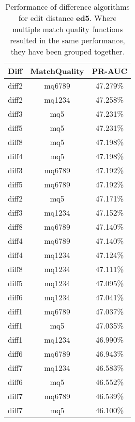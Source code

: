 \begin{table}[tbph]
\begin{center}
\begin{tabular}{|c|c||c|}
\hline
Diff & MatchQuality & PR-AUC  \\
\hline
\hline
diff2 & mq6789 & 47.279\% \\
diff2 & mq1234 & 47.258\% \\
diff3 & mq5 & 47.231\% \\
diff5 & mq5 & 47.231\% \\
diff8 & mq5 & 47.198\% \\
diff4 & mq5 & 47.198\% \\
diff3 & mq6789 & 47.192\% \\
diff5 & mq6789 & 47.192\% \\
diff2 & mq5 & 47.171\% \\
diff3 & mq1234 & 47.152\% \\
diff8 & mq6789 & 47.140\% \\
diff4 & mq6789 & 47.140\% \\
diff4 & mq1234 & 47.124\% \\
diff8 & mq1234 & 47.111\% \\
diff5 & mq1234 & 47.095\% \\
diff6 & mq1234 & 47.041\% \\
diff1 & mq6789 & 47.037\% \\
diff1 & mq5 & 47.035\% \\
diff1 & mq1234 & 46.990\% \\
diff6 & mq6789 & 46.943\% \\
diff7 & mq1234 & 46.583\% \\
diff6 & mq5 & 46.552\% \\
diff7 & mq6789 & 46.539\% \\
diff7 & mq5 & 46.100\% \\
\hline
\end{tabular}
\end{center}
\caption{Performance of difference algorithms for
  edit distance \textbf{ed5}.  Where multiple match
  quality functions resulted in the same performance, they
  have been grouped together.}
\label{tab:editlongbyed5}
\end{table}
